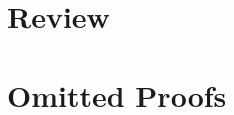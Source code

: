 \documentclass[a4paper,UKenglish,cleveref, autoref]{lipics-v2019}
\begin{document}




\clearpage
\appendix
\section{Review}




\section{Omitted Proofs}


\end{document}
